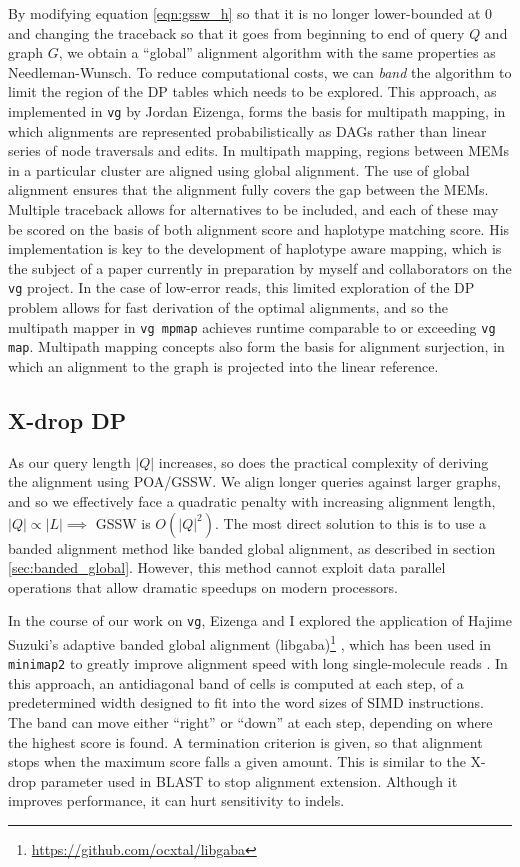 \documentclass[a4paper,12pt,numbered,oneside]{Classes/PhDThesisPSnPDF}
\begin{document}
By modifying equation \ref{eqn:gssw_h} so that it is no longer lower-bounded at 0 and changing the traceback so that it goes from beginning to end of query $Q$ and graph $G$, we obtain a ``global'' alignment algorithm with the same properties as Needleman-Wunsch.
To reduce computational costs, we can \emph{band} the algorithm to limit the region of the DP tables which needs to be explored.
This approach, as implemented in {\tt vg} by Jordan Eizenga, forms the basis for multipath mapping, in which alignments are represented probabilistically as DAGs rather than linear series of node traversals and edits.
In multipath mapping, regions between MEMs in a particular cluster are aligned using global alignment.
The use of global alignment ensures that the alignment fully covers the gap between the MEMs.
Multiple traceback allows for alternatives to be included, and each of these may be scored on the basis of both alignment score and haplotype matching score.
His implementation is key to the development of haplotype aware mapping, which is the subject of a paper currently in preparation by myself and collaborators on the {\tt vg} project.
In the case of low-error reads, this limited exploration of the DP problem allows for fast derivation of the optimal alignments, and so the multipath mapper in {\tt vg mpmap} achieves runtime comparable to or exceeding {\tt vg map}.
Multipath mapping concepts also form the basis for alignment surjection, in which an alignment to the graph is projected into the linear reference.

\subsection{X-drop DP}

As our query length $|Q|$ increases, so does the practical complexity of deriving the alignment using POA/GSSW.
We align longer queries against larger graphs, and so we effectively face a quadratic penalty with increasing alignment length, $|Q| \propto |L| \implies$ GSSW is $O(|Q|^2)$.
The most direct solution to this is to use a banded alignment method like banded global alignment, as described in section \ref{sec:banded_global}.
However, this method cannot exploit data parallel operations that allow dramatic speedups on modern processors.

In the course of our work on {\tt vg}, Eizenga and I explored the application of Hajime Suzuki's adaptive banded global alignment (libgaba)\footnote{\url{https://github.com/ocxtal/libgaba}} \cite{suzuki2017acceleration}, which has been used in {\tt minimap2} to greatly improve alignment speed with long single-molecule reads \cite{li2018minimap2}.
In this approach, an antidiagonal band of cells is computed at each step, of a predetermined width designed to fit into the word sizes of SIMD instructions.
The band can move either ``right'' or ``down'' at each step, depending on where the highest score is found.
A termination criterion is given, so that alignment stops when the maximum score falls a given amount.
This is similar to the X-drop parameter used in BLAST to stop alignment extension.
Although it improves performance, it can hurt sensitivity to indels.
\end{document}
